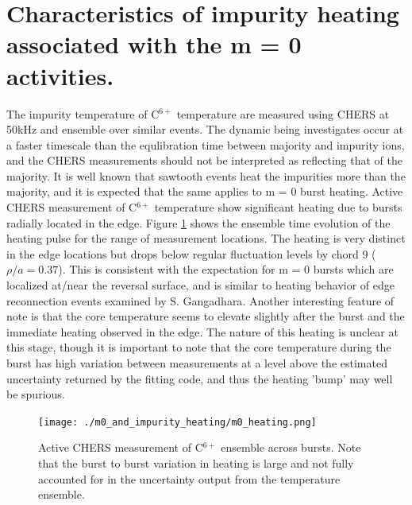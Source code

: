 \section{Characteristics of impurity heating associated with the m = 0 activities.}

The impurity temperature of C$^{6+}$ temperature are measured using CHERS at 50kHz and ensemble over similar events.
The dynamic being investigates occur at a faster timescale than the equlibration time between majority and impurity ions, and the CHERS measurements should not be interpreted as reflecting that of the majority. It is well known that sawtooth events heat the impurities more than the majority, and it is expected that the same applies to m = 0 burst heating. Active CHERS measurement of C$^{6+}$ temperature show significant heating due to bursts radially located in the edge. Figure \ref{fig:m0_heating} shows the ensemble time evolution of the heating pulse for the range of measurement locations. The heating is very distinct in the edge locations but drops below regular fluctuation levels by chord 9 ($\rho/a = 0.37$). This is consistent with the expectation for m = 0 bursts which are localized at/near the reversal surface, and is similar to heating behavior of edge reconnection events examined by S. Gangadhara\cite{Gangadhara2008}. Another interesting feature of note is that the core temperature seems to elevate slightly after the burst and the immediate heating observed in the edge. The nature of this heating is unclear at this stage, though it is important to note that the core temperature during the burst has high variation between measurements at a level above the estimated uncertainty returned by the fitting code, and thus the heating 'bump' may well be spurious. 

\begin{figure}
	\centering
	\texttt{[image: ./m0\_and\_impurity\_heating/m0\_heating.png]}
	\caption{Active CHERS measurement of C$^{6+}$ ensemble across bursts. Note that the burst to burst variation in heating is large and not fully accounted for in the uncertainty output from the temperature ensemble.}\label{fig:m0_heating}
\end{figure}

